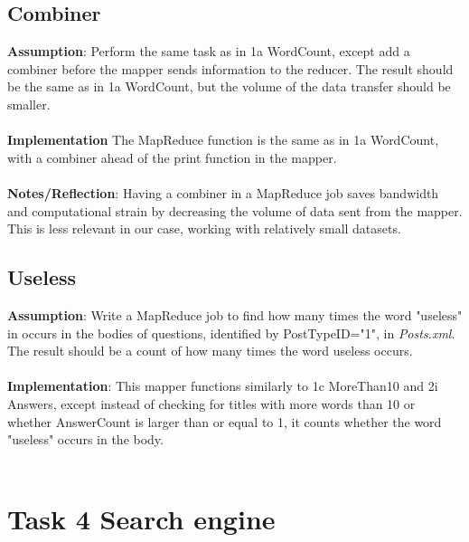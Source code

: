 \documentclass[fleqn,10pt]{wlscirep}
\begin{document}
\subsection{Combiner}
\textbf{Assumption}: Perform the same task as in 1a WordCount, except add a combiner before the mapper sends information to the reducer. The result should be the same as in 1a WordCount, but the volume of the data transfer should be smaller. \\ \\
\textbf{Implementation} The MapReduce function is the same as in 1a WordCount, with a combiner ahead of the print function in the mapper. \\ \\
\textbf{Notes/Reflection}: Having a combiner in a MapReduce job saves bandwidth and computational strain by decreasing the volume of data sent from the mapper. This is less relevant in our case, working with relatively small datasets.


\subsection{Useless}
\textbf{Assumption}: Write a MapReduce job to find how many times the word "useless" in occurs in the bodies of questions, identified by PostTypeID="1", in \textit{Posts.xml}. The result should be a count of how many times the word useless occurs. \\ \\
\textbf{Implementation}: This mapper functions similarly to 1c MoreThan10 and 2i Answers, except instead of checking for titles with more words than 10 or whether AnswerCount is larger than or equal to 1, it counts whether the word "useless" occurs in the body. \\ \\



\section{Task 4 Search engine}
\end{document}
